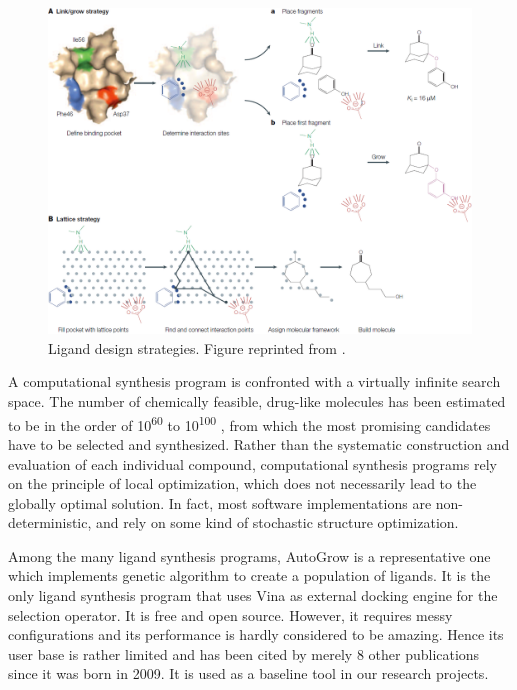 \begin{figure}[t]
\centering
\includegraphics[width=\textwidth]{igrow/LigandDesign.png}
\caption{Ligand design strategies. Figure reprinted from \citep{363}.}
\label{igrow:LigandDesign}
\end{figure}

A computational synthesis program is confronted with a virtually infinite search space. The number of chemically feasible, drug-like molecules has been estimated to be in the order of 10\textsuperscript{60} to 10\textsuperscript{100} \citep{1104}, from which the most promising candidates have to be selected and synthesized. Rather than the systematic construction and evaluation of each individual compound, computational synthesis programs rely on the principle of local optimization, which does not necessarily lead to the globally optimal solution. In fact, most software implementations \citep{466,749} are non-deterministic, and rely on some kind of stochastic structure optimization.

Among the many ligand synthesis programs, AutoGrow \citep{466} is a representative one which implements genetic algorithm to create a population of ligands. It is the only ligand synthesis program that uses Vina \citep{595} as external docking engine for the selection operator. It is free and open source. However, it requires messy configurations and its performance is hardly considered to be amazing. Hence its user base is rather limited and has been cited by merely 8 other publications since it was born in 2009. It is used as a baseline tool in our research projects.

